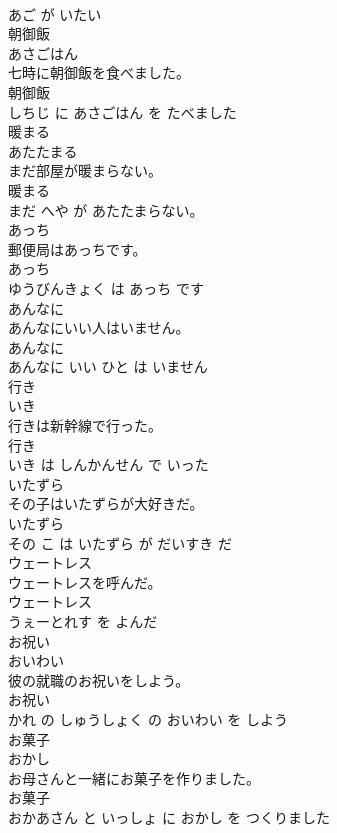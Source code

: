 \documentclass[8pt]{extreport}
\begin{document}
\begin{CJK}{UTF8}{min}
\\	あご が いたい			
\\	朝御飯	
\\	あさごはん			
\\	七時に朝御飯を食べました。	
\\	朝御飯 
\\	しちじ に あさごはん を たべました			
\\	暖まる	
\\	あたたまる			
\\	まだ部屋が暖まらない。	
\\	暖まる 
\\	まだ へや が あたたまらない。			
\\	あっち	
\\	郵便局はあっちです。	
\\	あっち 
\\	ゆうびんきょく は あっち です			
\\	あんなに	
\\	あんなにいい人はいません。	
\\	あんなに 
\\	あんなに いい ひと は いません			
\\	行き	
\\	いき			
\\	行きは新幹線で行った。	
\\	行き 
\\	いき は しんかんせん で いった			
\\	いたずら	
\\	その子はいたずらが大好きだ。	
\\	いたずら 
\\	その こ は いたずら が だいすき だ			
\\	ウェートレス	
\\	ウェートレスを呼んだ。	
\\	ウェートレス 
\\	うぇーとれす を よんだ			
\\	お祝い	
\\	おいわい			
\\	彼の就職のお祝いをしよう。	
\\	お祝い 
\\	かれ の しゅうしょく の おいわい を しよう			
\\	お菓子	
\\	おかし			
\\	お母さんと一緒にお菓子を作りました。	
\\	お菓子 
\\	おかあさん と いっしょ に おかし を つくりました			

\end{CJK}
\end{document}

